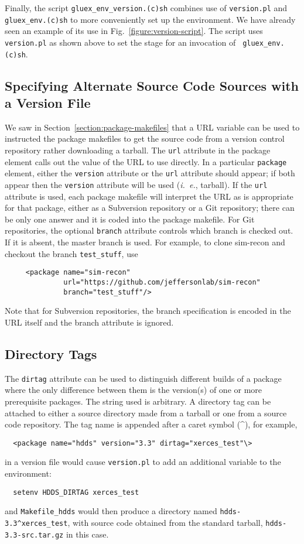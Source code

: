 \documentclass[12pt]{article}
\begin{document}
Finally, the script {\tt gluex\_env\_version.(c)sh} combines use of
{\tt version.pl} and {\tt gluex\_env.(c)sh} to more conveniently set
up the environment. We have already seen an example of its use in
Fig.~\ref{figure:version-script}. The script uses {\tt version.pl} as
shown above to set the stage for an invocation of {\tt
  gluex\_env.(c)sh}.

\subsection{Specifying Alternate Source Code Sources with a Version File}

We saw in Section~\ref{section:package-makefiles} that a URL variable
can be used to instructed the package makefiles to get the source code
from a version control repository rather downloading a tarball. The
{\tt url} attribute in the package element calls out the value of the
URL to use directly. In a particular {\tt package} element, either the
{\tt version} attribute or the {\tt url} attribute should
appear; if both appear then the {\tt version} attribute will
be used ({\it i.~e.}, tarball).
If the {\tt url} attribute is used, each package makefile
will interpret the URL as is appropriate for that package, either as a
Subversion repository or a Git repository; there can be only one
answer and it is coded into the package makefile. For Git
repositories, the optional {\tt branch} attribute controls which
branch is checked out. If it is absent, the master branch is
used. For example, to clone sim-recon and checkout the branch
{\tt test\_stuff}, use
\begin{verbatim}
     <package name="sim-recon"
              url="https://github.com/jeffersonlab/sim-recon"
              branch="test_stuff"/>
\end{verbatim}
Note that for Subversion repositories, the branch specification is
encoded in the URL itself and the branch attribute is ignored.

\subsection{Directory Tags}\label{section:directory-tags}

The {\tt dirtag} attribute can be used to distinguish different builds
of a package where the only difference between them is the version(s)
of one or more prerequisite packages. The string used is arbitrary. A
directory tag can be attached to either a source directory made from a
tarball or one from a source code repository. The tag name is appended
after a caret symbol (\^{}), for example,
\begin{verbatim}
  <package name="hdds" version="3.3" dirtag="xerces_test"\>
\end{verbatim}
in a version file would cause {\tt version.pl} to add an additional
variable to the environment:
\begin{verbatim}
  setenv HDDS_DIRTAG xerces_test
\end{verbatim}
and {\tt Makefile\_hdds} would then produce a directory named
{\tt hdds-3.3\^{}xerces\_test}, with source code obtained from the standard
tarball, {\tt hdds-3.3-src.tar.gz} in this case.
\end{document}
